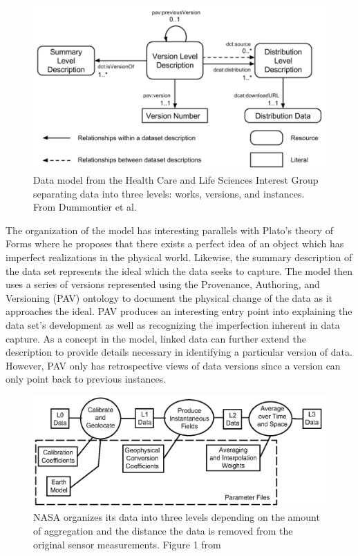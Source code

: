 \begin{figure}%
	\centering
	\includegraphics[scale=0.35]{figures/HCLSModel.png}
	\caption{Data model from the Health Care and Life Sciences Interest Group separating data into three levels: works, versions, and instances.  From Dummontier et al. \cite{Dummontier2016}}
	\label{HCLSModel}
\end{figure}

The organization of the model has interesting parallels with Plato's theory of Forms where he proposes that there exists a perfect idea of an object which has imperfect realizations in the physical world.
Likewise, the summary description of the data set represents the ideal which the data seeks to capture.
The model then uses a series of versions represented using the Provenance, Authoring, and Versioning (PAV) ontology to document the physical change of the data as it approaches the ideal\cite{Ciccarese2013}.
PAV produces an interesting entry point into explaining the data set's development as well as recognizing the imperfection inherent in data capture.
As a concept in the model, linked data can further extend the description to provide details necessary in identifying a particular version of data.
However, PAV only has retrospective views of data versions since a version can only point back to previous instances.

\begin{figure}
	\centering
	\includegraphics[scale=0.40]{figures/NASALevels.png}
	\caption{NASA organizes its data into three levels depending on the amount of aggregation and the distance the data is removed from the original sensor measurements. Figure 1 from \cite{Barkstrom2003}}
	\label{NASALevels}
\end{figure}

